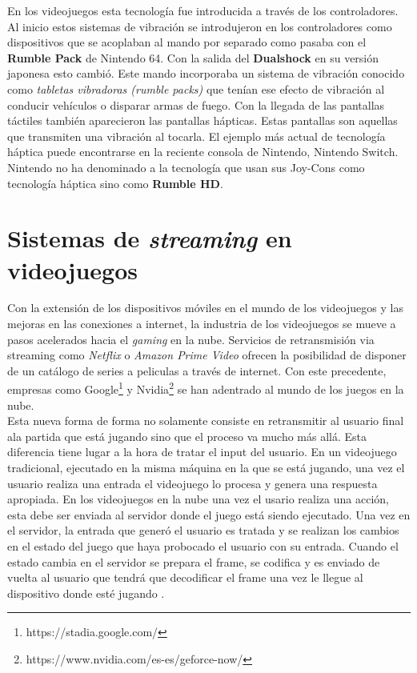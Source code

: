 En los videojuegos esta tecnolog\'ia fue introducida a trav\'es de los controladores. Al inicio estos sistemas de vibraci\'on se introdujeron en los controladores como dispositivos que se acoplaban al mando por separado como pasaba con el \textbf{Rumble Pack} de Nintendo 64. Con la salida del \textbf{Dualshock} en su versi\'on japonesa esto cambi\'o. Este mando incorporaba un sistema de vibraci\'on conocido como \textit{tabletas vibradoras (rumble packs)} que ten\'ian ese efecto de vibraci\'on al conducir veh\'iculos o disparar armas de fuego. Con la llegada de las pantallas t\'actiles tambi\'en aparecieron las pantallas h\'apticas. Estas pantallas son aquellas que transmiten una vibraci\'on al tocarla. El ejemplo m\'as actual de tecnolog\'ia h\'aptica puede encontrarse en la reciente consola de Nintendo, Nintendo Switch. Nintendo no ha denominado a la tecnolog\'ia que usan sus Joy-Cons como tecnolog\'ia h\'aptica sino como \textbf{Rumble HD}. 


\section{Sistemas de \textit{streaming} en videojuegos}

Con la extensi\'on de los dispositivos m\'oviles en el mundo de los videojuegos y las mejoras en las conexiones a internet, la industria de los videojuegos se mueve a pasos acelerados hacia el \textit{gaming} en la nube. Servicios de retransmisi\'on via streaming como \textit{Netflix} o \textit{Amazon Prime Video} ofrecen la posibilidad de disponer de un cat\'alogo de series a peliculas a trav\'es de internet. Con este precedente, empresas como Google\footnote{https://stadia.google.com/} y Nvidia\footnote{https://www.nvidia.com/es-es/geforce-now/} se han adentrado al mundo de los juegos en la nube.\\

Esta nueva forma de forma no solamente consiste en retransmitir al usuario final ala partida que est\'a jugando sino que el proceso va mucho m\'as all\'a. Esta diferencia tiene lugar a la hora de tratar el input del usuario. En un videojuego tradicional, ejecutado en la misma m\'aquina en la que se est\'a jugando, una vez el usuario realiza una entrada el videojuego lo procesa y genera una respuesta apropiada. En los videojuegos en la nube una vez el usario realiza una acci\'on, esta debe ser enviada al servidor donde el juego est\'a siendo ejecutado. Una vez en el servidor, la entrada que gener\'o el usuario es tratada y se realizan los cambios en el estado del juego que haya probocado el usuario con su entrada. Cuando el estado cambia en el servidor se prepara el frame, se codifica y es enviado de vuelta al usuario que tendr\'a que decodificar el frame una vez le llegue al dispositivo donde est\'e jugando \citep{cloudgaming}.

